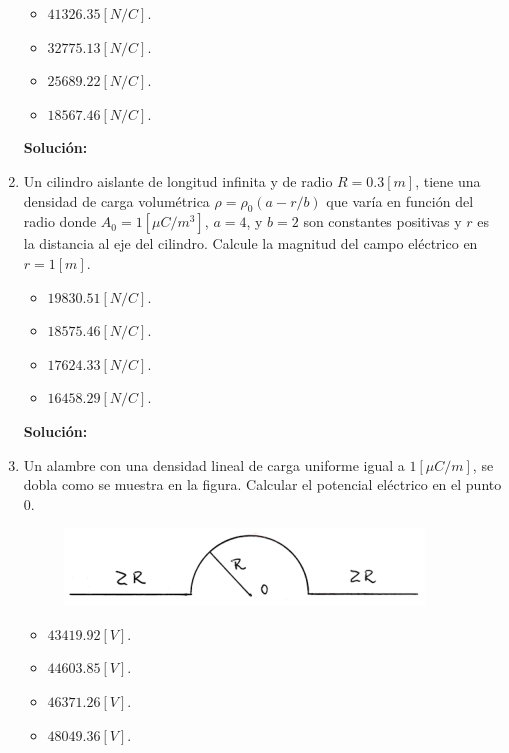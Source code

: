 \documentclass[letter,11pt]{article}
\begin{document}
\begin{enumerate}
\begin{itemize}
    \item $41326.35 [N/C]$.
    \item $32775.13 [N/C]$.
    \item $25689.22 [N/C]$.
    \item $18567.46 [N/C]$.
\end{itemize}

\textbf{Solución:} \\

\item  Un cilindro aislante de longitud infinita y de radio $R = 0.3 [m]$, tiene
una densidad de carga volumétrica $\rho = \rho_0 (a - r/b )$ que varía en función del
radio donde $A_0 = 1 [\mu C/m^3]$, $a = 4$, y $b = 2$ son constantes positivas y
$r$ es la distancia al eje del cilindro. Calcule la magnitud del campo eléctrico
en $r = 1 [m]$.

\begin{itemize}
    \item $19830.51 [N/C]$.
    \item $18575.46 [N/C]$.
    \item $17624.33 [N/C]$.
    \item $16458.29 [N/C]$.
\end{itemize}

\textbf{Solución:} \\

\item Un alambre con una densidad lineal de carga uniforme igual a
$1 [\mu C/m]$, se dobla como se muestra en la figura. Calcular el potencial
eléctrico en el punto $0$.

\begin{figure}[!h]
\centering
\includegraphics[scale=1.80]{resources/q4.eps}
\end{figure}

\begin{itemize}
    \item $43419.92 [V]$.
    \item $44603.85 [V]$.
    \item $46371.26 [V]$.
    \item $48049.36 [V]$.
\end{itemize}


\end{enumerate}
\end{document}
